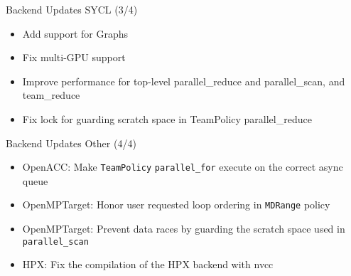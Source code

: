 \begin{frame}[fragile]{Backend Updates SYCL (3/4)}

\begin{itemize}
  \item Add support for Graphs
  \item Fix multi-GPU support 
  \item Improve performance for top-level parallel\_reduce and parallel\_scan, and team\_reduce 
  \item Fix lock for guarding scratch space in TeamPolicy parallel\_reduce 
\end{itemize}


\end{frame}

\begin{frame}[fragile]{Backend Updates Other (4/4)}

\begin{itemize}
\item OpenACC: Make \texttt{TeamPolicy} \texttt{parallel\_for} execute on the correct async queue
\item OpenMPTarget: Honor user requested loop ordering in \texttt{MDRange} policy
\item OpenMPTarget: Prevent data races by guarding the scratch space used in \texttt{parallel\_scan}
\item HPX: Fix the compilation of the HPX backend with nvcc 
\end{itemize}

\end{frame}


